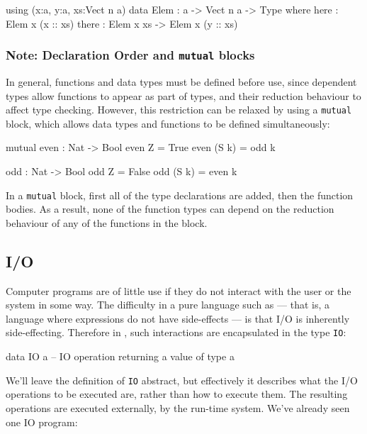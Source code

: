 \begin{code}
using (x:a, y:a, xs:Vect n a)
  data Elem : a -> Vect n a -> Type where
     here  : Elem x (x :: xs)
     there : Elem x xs -> Elem x (y :: xs)
\end{code}

\subsubsection*{Note: Declaration Order and \texttt{mutual} blocks}

In general, functions and data types must be defined before use, since dependent types allow functions to appear as part of types, and their reduction behaviour to affect type checking.
However, this restriction can be relaxed by using a \texttt{mutual} block, which allows data types and functions to be defined simultaneously:

\begin{code}
mutual
  even : Nat -> Bool
  even Z = True
  even (S k) = odd k

  odd : Nat -> Bool
  odd Z = False
  odd (S k) = even k
\end{code}


\noindent
In a \texttt{mutual} block, first all of the type declarations are added, then the function bodies.
As a result, none of the function types can depend on the reduction behaviour of any of the functions in the block.

\subsection{I/O}

Computer programs are of little use if they do not interact with the user or the system in some way.
The difficulty in a pure language such as \Idris{} --- that is, a language where expressions do not have side-effects --- is that I/O is inherently side-effecting.
Therefore in \Idris{}, such interactions are encapsulated in the type \texttt{IO}:

\begin{code}
data IO a -- IO operation returning a value of type a
\end{code}

\noindent
We'll leave the definition of \texttt{IO} abstract, but effectively it describes what the I/O operations to be executed are, rather than how to execute them.
The resulting operations are executed externally, by the run-time system.
We've already seen one IO program:

